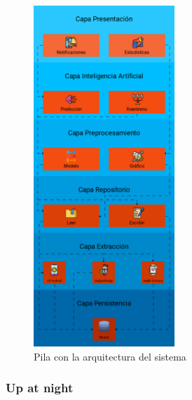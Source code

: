                 \vspace*{5mm}
                \begin{figure}[H]
                    \centering
                    \includegraphics[width=0.475\textwidth]{figures/inception-deck/Pila.png}
                    \caption{Pila con la arquitectura del sistema}
                    \label{fig:dev:arquitecturaPila}
                \end{figure}
            
            \subsubsection{Up at night}
                
